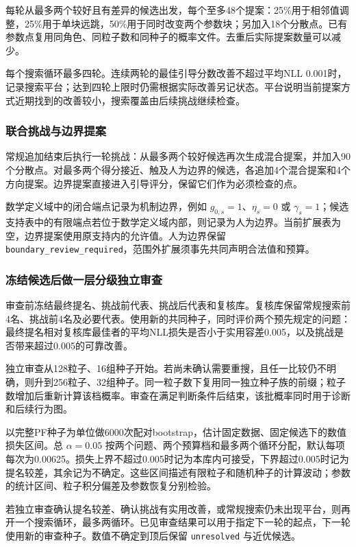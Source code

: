 \documentclass[12pt]{article}
\begin{document}
每轮从最多两个较好且有差异的候选出发，每个至多48个提案：25\%用于相邻值调整，25\%用于单块远跳，50\%用于同时改变两个参数块；另加入18个分散点。已有参数点复用同角色、同粒子数和同种子的概率文件。去重后实际提案数量可以减少。

每个搜索循环最多四轮。连续两轮的最佳引导分数改善不超过平均NLL 0.001时，记录搜索平台；达到四轮上限时仍需根据实际改善另记状态。平台说明当前提案方式近期找到的改善较小，搜索覆盖由后续挑战继续检查。

\subsubsection{联合挑战与边界提案}

常规追加结束后执行一轮挑战：从最多两个较好候选再次生成混合提案，并加入90个分散点。对最多两个得分接近、触及人为边界的候选，各追加4个混合提案和4个方向提案。边界提案直接进入引导评分，保留它们作为必须检查的点。

数学定义域中的闭合端点记录为机制边界，例如 $g_{0,s}=1$、$\eta_s=0$ 或 $\gamma_s=1$；候选支持表中的有限端点若位于数学定义域内部，则记录为人为边界。当前扩展表为空，边界提案使用原支持内的允许值。人为边界保留 \texttt{boundary\_review\_required}，范围外扩展须事先共同声明合法值和预算。

\subsubsection{冻结候选后做一层分级独立审查}

审查前冻结最终提名、挑战前代表、挑战后代表和复核库。复核库保留常规搜索前4名、挑战前4名及必要代表。使用新的共同种子，同时评价两个预先规定的问题：最终提名相对复核库最佳者的平均NLL损失是否小于实用容差0.005，以及挑战是否带来超过0.005的可靠改善。

独立审查从128粒子、16组种子开始。若尚未确认需要重搜，且任一比较仍不明确，则升到256粒子、32组种子。同一粒子数下复用同一独立种子族的前缀；粒子数增加后重新计算该档概率。审查在满足判断条件后结束，该批概率同时用于诊断和后续行为图。

以完整PF种子为单位做6000次配对bootstrap，估计固定数据、固定候选下的数值损失区间。总 $\alpha=0.05$ 按两个问题、两个预算档和最多两个循环分配，默认每项每次为0.00625。损失上界不超过0.005时记为本库内可接受，下界超过0.005时记为提名较差，其余记为不确定。这些区间描述有限粒子和随机种子的计算波动；参数的统计区间、粒子积分偏差及参数恢复分别检验。

若独立审查确认提名较差、确认挑战有实用改善，或常规搜索仍未出现平台，则再开一个搜索循环，最多两循环。已见审查结果可以用于指定下一轮的起点，下一轮使用新的审查种子。数值不确定到顶后保留 \texttt{unresolved} 与近优候选。
\end{document}
